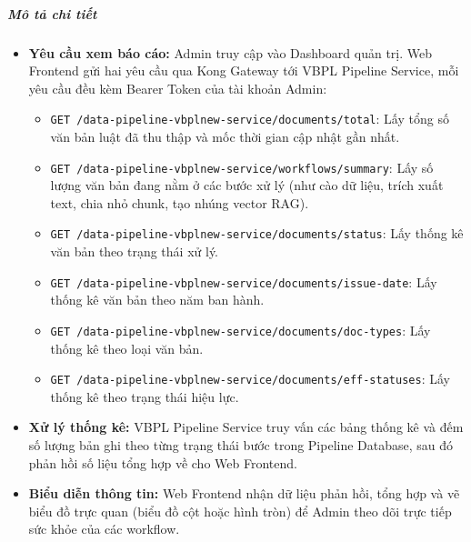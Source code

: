 \subparagraph{Mô tả chi tiết}
\begin{itemize}
\item \textbf{Yêu cầu xem báo cáo:} Admin truy cập vào Dashboard quản trị. Web Frontend gửi hai yêu cầu qua Kong Gateway tới VBPL Pipeline Service, mỗi yêu cầu đều kèm Bearer Token của tài khoản Admin:
\begin{itemize}
\item \texttt{GET /data-pipeline-vbplnew-service/documents/total}: Lấy tổng số văn bản luật đã thu thập và mốc thời gian cập nhật gần nhất.
\item \texttt{GET /data-pipeline-vbplnew-service/workflows/summary}: Lấy số lượng văn bản đang nằm ở các bước xử lý (như cào dữ liệu, trích xuất text, chia nhỏ chunk, tạo nhúng vector RAG).
\item \texttt{GET /data-pipeline-vbplnew-service/documents/status}: Lấy thống kê văn bản theo trạng thái xử lý.
\item \texttt{GET /data-pipeline-vbplnew-service/documents/issue-date}: Lấy thống kê văn bản theo năm ban hành.
\item \texttt{GET /data-pipeline-vbplnew-service/documents/doc-types}: Lấy thống kê theo loại văn bản.
\item \texttt{GET /data-pipeline-vbplnew-service/documents/eff-statuses}: Lấy thống kê theo trạng thái hiệu lực.
\end{itemize}
\item \textbf{Xử lý thống kê:} VBPL Pipeline Service truy vấn các bảng thống kê và đếm số lượng bản ghi theo từng trạng thái bước trong Pipeline Database, sau đó phản hồi số liệu tổng hợp về cho Web Frontend.
\item \textbf{Biểu diễn thông tin:} Web Frontend nhận dữ liệu phản hồi, tổng hợp và vẽ biểu đồ trực quan (biểu đồ cột hoặc hình tròn) để Admin theo dõi trực tiếp sức khỏe của các workflow.
\end{itemize}
